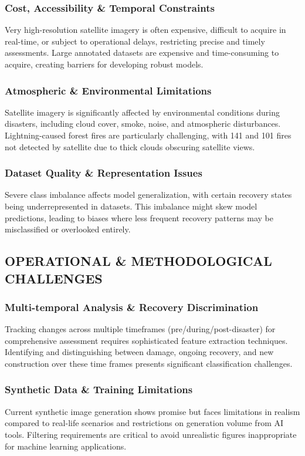 \documentclass[conference,a4paper]{IEEEtran}
\begin{document}
\subsubsection{Cost, Accessibility \& Temporal Constraints}
Very high-resolution satellite imagery is often expensive, difficult to acquire in real-time, or subject to operational delays, restricting precise and timely assessments. Large annotated datasets are expensive and time-consuming to acquire, creating barriers for developing robust models.
\subsubsection{Atmospheric \& Environmental Limitations}
Satellite imagery is significantly affected by environmental conditions during disasters, including cloud cover, smoke, noise, and atmospheric disturbances. Lightning-caused forest fires are particularly challenging, with 141 and 101 fires not detected by satellite due to thick clouds obscuring satellite views.
\subsubsection{Dataset Quality \& Representation Issues}
Severe class imbalance affects model generalization, with certain recovery states being underrepresented in datasets. This imbalance might skew model predictions, leading to biases where less frequent recovery patterns may be misclassified or overlooked entirely.
\subsection{OPERATIONAL \& METHODOLOGICAL CHALLENGES}
\subsubsection{Multi-temporal Analysis \& Recovery Discrimination}
Tracking changes across multiple timeframes (pre/during/post-disaster) for comprehensive assessment requires sophisticated feature extraction techniques. Identifying and distinguishing between damage, ongoing recovery, and new construction over these time frames presents significant classification challenges.
\subsubsection{Synthetic Data \& Training Limitations}
Current synthetic image generation shows promise but faces limitations in realism compared to real-life scenarios and restrictions on generation volume from AI tools. Filtering requirements are critical to avoid unrealistic figures inappropriate for machine learning applications.
\end{document}
